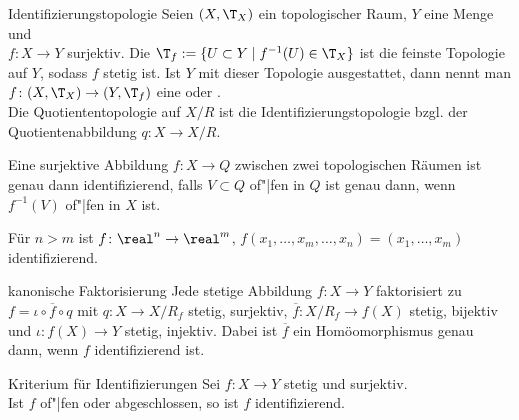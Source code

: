 \linie
\pagebreak

\begin{Def}{Identifizierungstopologie}
    Seien $(X, \T_X)$ ein topologischer Raum, $Y$ eine Menge und \\
    $f\colon X \rightarrow Y$ surjektiv.
    Die 
    $\T_f := \{U \subset Y \;|\; f^{-1}(U) \in \T_X\}$
    ist die feinste Topologie auf $Y$, sodass $f$ stetig ist.
    Ist $Y$ mit dieser Topologie ausgestattet, dann nennt man
    $f\colon (X, \T_X) \rightarrow (Y, \T_f)$ eine  oder
    . \\
    Die Quotiententopologie auf $X/R$ ist die Identifizierungstopologie
    bzgl. der Quotientenabbildung $q\colon X \rightarrow X/R$.
\end{Def}

\begin{Bem}
    Eine surjektive Abbildung $f\colon X \rightarrow Q$ zwischen zwei
    topologischen Räumen ist genau dann identifizierend, falls
    $V \subset Q$ of"|fen in $Q$ ist genau dann, wenn $f^{-1}(V)$ of"|fen
    in $X$ ist.
\end{Bem}

\begin{Bsp}
    Für $n > m$ ist $f\colon \real^n \rightarrow \real^m$,
    $f(x_1, \dotsc, x_m, \dotsc, x_n) = (x_1, \dotsc, x_m)$ identifizierend.
\end{Bsp}

\linie

\begin{Satz}{kanonische Faktorisierung}
    Jede stetige Abbildung $f\colon X \rightarrow Y$ faktorisiert zu
    $f = \iota \circ \overline{f} \circ q$ mit $q\colon X \rightarrow X/R_f$
    stetig, surjektiv, $\overline{f}\colon X/R_f \rightarrow f(X)$
    stetig, bijektiv und $\iota\colon f(X) \rightarrow Y$ stetig, injektiv.
    Dabei ist $\overline{f}$ ein Homöomorphismus genau dann, wenn
    $f$ identifizierend ist.
\end{Satz}

\begin{Satz}{Kriterium für Identifizierungen}
    Sei $f\colon X \rightarrow Y$ stetig und surjektiv. \\
    Ist $f$ of"|fen oder abgeschlossen, so ist $f$ identifizierend.
\end{Satz}

